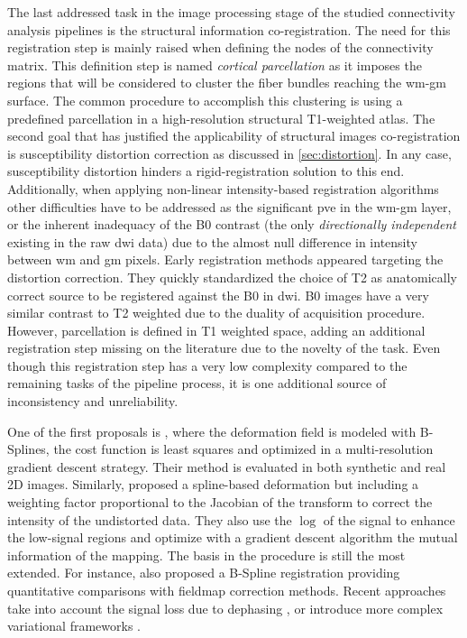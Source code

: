 The last addressed task in the image processing stage of the studied 
connectivity analysis pipelines is the structural information co-registration.
The need for this registration step is mainly raised when defining the 
nodes of the connectivity matrix. This definition step is named
\textit{cortical parcellation} as it imposes the regions that will be
considered to cluster the fiber bundles reaching the \gls{wm}-\gls{gm}
surface. The common procedure to accomplish this clustering is using
a predefined parcellation in a high-resolution structural T1-weighted 
atlas. The second goal that has justified the applicability of structural
images co-registration is susceptibility distortion correction
as discussed in \autoref{sec:distortion}. In any case, susceptibility 
distortion hinders a rigid-registration solution to this end.
Additionally, when applying non-linear intensity-based
registration algorithms other difficulties have to be addressed as
the significant \gls{pve} in the \gls{wm}-\gls{gm} layer, or the
inherent inadequacy of the B0 contrast (the only \textit{directionally
independent} existing in the raw \gls{dwi} data) due to the almost null
difference in intensity between \gls{wm} and \gls{gm} pixels. Early 
registration methods appeared targeting the distortion correction.
They quickly standardized the choice of T2 as anatomically correct source
to be registered against the B0 in \gls{dwi}. B0 images have a very similar
contrast to T2 weighted due to the duality of acquisition procedure. However,
parcellation is defined in T1 weighted space, adding an additional registration
step missing on the literature due to the novelty of the task. Even though this
registration step has a very low complexity compared to the remaining tasks of 
the pipeline process, it is one additional source of inconsistency and unreliability.


One of the first proposals is \citep{kybic_unwarping_2000}, where the deformation
field is modeled with B-Splines, the cost function is least squares and optimized
in a multi-resolution gradient descent strategy. Their method is evaluated in 
both synthetic and real 2D images. Similarly,
\citep{studholme_accurate_2000} proposed a spline-based deformation but including
a weighting factor proportional to the Jacobian of the transform to correct the
intensity of the undistorted data. They also use the $\log$ of the signal to
enhance the low-signal regions and optimize with a gradient descent algorithm
the mutual information of the mapping. The basis in the procedure is still the most 
extended. For instance, \citep{wu_comparison_2008} also proposed a B-Spline registration
providing quantitative comparisons with fieldmap correction methods. Recent approaches
take into account the signal loss due to dephasing \citep{li_accounting_2007}, or 
introduce more complex variational frameworks \citep{tao_variational_2009}.

